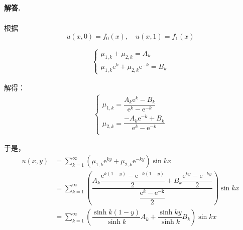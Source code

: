\documentclass[12pt, a4paper, oneside]{ctexart}
\newenvironment{solution}{\par\noindent\textbf{解答. }}{\par}
\begin{document}
\begin{solution}
$$\begin{aligned}
\end{aligned}
$$
\par
根据$$u(x,0)=f_0(x), \quad
u(x,1)=f_1(x)$$
\par
$$
\begin{aligned}
\begin{cases}
\mu_{1,k}+\mu_{2,k}=A_k\\
\mu_{1,k}\mathrm{e}^k+\mu_{2,k}\mathrm{e}^{-k}=B_k
\end{cases}
\end{aligned}
$$
\par
解得：
$$
\begin{aligned}
  \begin{cases}
  \mu_{1,k}=\dfrac{A_k\mathrm{e}^k-B_k}{\mathrm{e}^k-\mathrm{e}^{-k}}\\
  \mu_{2,k}=\dfrac{-A_k\mathrm{e}^{-k}+B_k}{\mathrm{e}^k-\mathrm{e}^{-k}}\\
  \end{cases}
  \end{aligned}
$$
\par
于是，
$$
\begin{aligned}
u(x,y)&=\sum_{k=1}^{\infty}\left(\mu_{1,k}\mathrm{e}^{ky}+\mu_{2,k}\mathrm{e}^{-ky}\right)\sin kx\\
&=\sum_{k=1}^{\infty}\left(\dfrac{A_k\dfrac{\mathrm{e}^{k(1-y)}-\mathrm{e}^{-k(1-y)}}{2}
+B_k\dfrac{\mathrm{e}^{ky}-\mathrm{e}^{-ky}}{2}}{\dfrac{\mathrm{e}^k-\mathrm{e^{-k}}}{2}}\right)\sin kx\\
&=\sum_{k=1}^{\infty}\left(\dfrac{\sinh k(1-y)}{\sinh k}A_k+\dfrac{\sinh ky}{\sinh k}B_k\right)\sin kx
\end{aligned}
$$
\end{solution}
\end{document}
